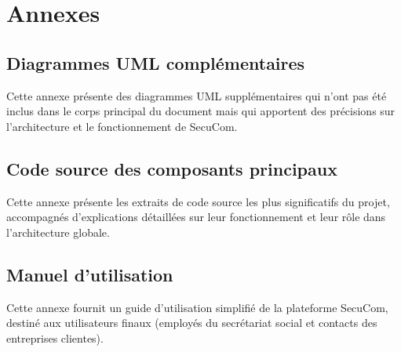 \documentclass[12pt,a4paper,oneside]{memoir}
\begin{document}





\tableofcontents
\newpage

\listoffigures
\newpage

























\appendix
\chapter{Annexes}
\section{Diagrammes UML complémentaires}
Cette annexe présente des diagrammes UML supplémentaires qui n'ont pas été inclus dans le corps principal du document mais qui apportent des précisions sur l'architecture et le fonctionnement de SecuCom.

\section{Code source des composants principaux}
Cette annexe présente les extraits de code source les plus significatifs du projet, accompagnés d'explications détaillées sur leur fonctionnement et leur rôle dans l'architecture globale.

\section{Manuel d'utilisation}
Cette annexe fournit un guide d'utilisation simplifié de la plateforme SecuCom, destiné aux utilisateurs finaux (employés du secrétariat social et contacts des entreprises clientes).
\end{document}
